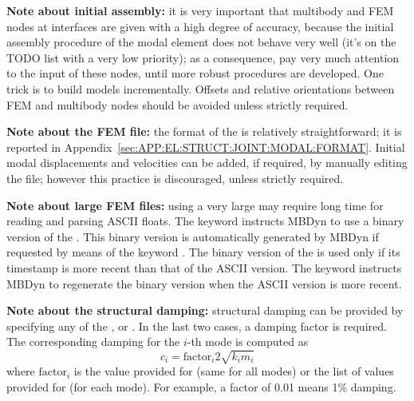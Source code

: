 \noindent
\textbf{Note about initial assembly:} it is very important that multibody 
and FEM nodes at interfaces are given with a high degree of accuracy,
because the initial assembly procedure of the modal element
does not behave very well (it's on the TODO list with a very low
priority); as a consequence, pay very much attention to the input
of these nodes, until more robust procedures are developed.
One trick is to build models incrementally.
Offsets and relative orientations between FEM and multibody nodes 
should be avoided unless strictly required.

\noindent
\textbf{Note about the FEM file:}
the format of the  is relatively straightforward;
it is reported
in Appendix~\ref{sec:APP:EL:STRUCT:JOINT:MODAL:FORMAT}.
Initial modal displacements and velocities can be added,
if required, by manually editing the file; however this practice
is discouraged, unless strictly required.


\noindent
\textbf{Note about large FEM files:}
using a very large  may require long time for
reading and parsing ASCII floats.
The keyword  instructs MBDyn to use a binary version
of the .
This binary version is automatically generated by MBDyn if requested
by means of the keyword .
The binary version of the  is used only if its
timestamp is more recent than that of the ASCII version.
The keyword  instructs MBDyn to regenerate the
binary version when the ASCII version is more recent.

\noindent
\textbf{Note about the structural damping:}
structural damping can be provided by specifying any of the
,  or .
In the last two cases, a damping factor is required.
The corresponding damping for the $i$-th mode is computed as
\begin{displaymath}
	c_i = \mathrm{factor}_i 2 \sqrt{k_i m_i}
\end{displaymath}
where $\mathrm{factor}_i$ is the value provided
for  (same for all modes) or the list 
of values provided for  (for each mode).
For example, a factor of 0.01 means 1\% damping.

